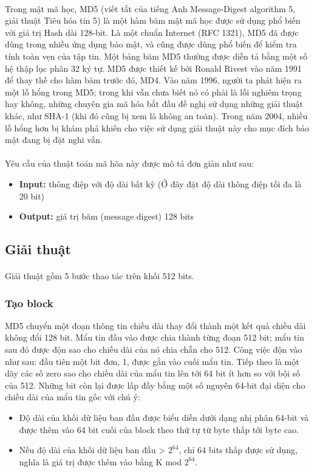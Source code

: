 \documentclass[../report.tex]{subfiles}
\begin{document}
\paragraph*{}Trong mật mã học, MD5 (viết tắt của tiếng Anh Message-Digest algorithm 5, giải thuật Tiêu hóa tin 5) là một hàm 
băm mật mã học được sử dụng phổ biến với giá trị Hash dài 128-bit. Là một chuẩn Internet (RFC 1321), MD5 đã được dùng trong 
nhiều ứng dụng bảo mật, và cũng được dùng phổ biến để kiểm tra tính toàn vẹn của tập tin. 
Một bảng băm MD5 thường được diễn tả bằng một số hệ thập lục phân 32 ký tự.
MD5 được thiết kế bởi Ronald Rivest vào năm 1991 để thay thế cho hàm băm trước đó, MD4. 
Vào năm 1996, người ta phát hiện ra một lỗ hổng trong MD5; 
trong khi vẫn chưa biết nó có phải là lỗi nghiêm trọng hay không, những chuyên gia mã hóa bắt đầu đề nghị 
sử dụng những giải thuật khác, như SHA-1 (khi đó cũng bị xem là không an toàn). Trong năm 2004, nhiều lỗ hổng hơn bị 
khám phá khiến cho việc sử dụng giải thuật này cho mục đích bảo mật đang bị đặt nghi vấn. 
\paragraph*{} Yêu cầu của thuật toán mã hõa này được mô tả đơn giản như sau:
\begin{itemize}
    \item \textbf{Input: } thông điệp với độ dài bất kỳ (Ở đây đặt độ dài thông điệp tối đa là 20 bit)
    \item \textbf{Output: } giá trị băm (message digest) 128 bits
\end{itemize}

\subsection{Giải thuật}
\paragraph*{}Giải thuật gồm 5 bước thao tác trên khối 512 bits.
\subsubsection{Tạo block}
MD5 chuyển một đoạn thông tin chiều dài thay đổi thành 
một kết quả chiều dài không đổi 128 bit. Mẩu tin đầu vào được chia thành từng đoạn 512 bit; mẩu tin sau đó được độn sao 
cho chiều dài của nó chia chẵn cho 512. Công việc độn vào như sau: đầu tiên một bit đơn, 1, được gắn vào cuối mẩu tin. 
Tiếp theo là một dãy các số zero sao cho chiều dài của mẩu tin lên tới 64 bit ít hơn so với bội số của 512. 
Những bit còn lại được lấp đầy bằng một số nguyên 64-bit đại diện cho chiều dài của mẩu tin gốc với chú ý:
\begin{itemize}
    \item Độ dài của khối dữ liệu ban đầu được biểu diễn dưới dạng nhị phân 64-bit và được thêm vào 64 bit cuối của block theo thứ tự từ byte thấp tới byte cao.
    \item Nếu độ dài của khối dữ liệu ban đầu > $2^{64}$, chỉ 64 bits thấp được sử dụng, nghĩa là giá trị được thêm vào bằng K mod $2^{64}$.
\end{itemize}
\end{document}
